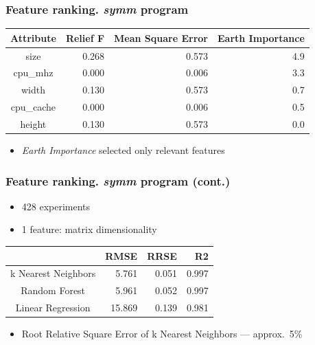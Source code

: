 \documentclass{beamer}
\begin{document}
\begin{frame}
\frametitle{Feature ranking. \textit{symm} program}

	\begin{center}
	\begin{tabular}{|c|r|r|r|}
	\hline
	Attribute & Relief F & Mean Square Error & Earth Importance \\
	\hline
	size & 0.268 & 0.573 & 4.9 \\
	cpu\_mhz & 0.000 & 0.006 & 3.3 \\
	width & 0.130 & 0.573 & 0.7 \\
	cpu\_cache & 0.000 & 0.006 & 0.5 \\
	height & 0.130 & 0.573 & 0.0 \\
	\hline
	\end{tabular}
	\end{center}

	\begin{itemize}
		\item \textit{Earth Importance} selected only relevant features
	\end{itemize}

\end{frame}

\begin{frame}
\frametitle{Feature ranking. \textit{symm} program (cont.)}

	\begin{itemize}
		\item 428 experiments
		\item 1 feature: matrix dimensionality
	\end{itemize}

	\begin{center}
	\begin{tabular}{|c|r|r|r|}
	\hline
	 & RMSE & RRSE & R2 \\
	\hline
	k Nearest Neighbors & 5.761 & 0.051 & 0.997 \\
	Random Forest & 5.961 & 0.052 & 0.997 \\
	Linear Regression & 15.869 & 0.139 & 0.981 \\
	\hline
	\end{tabular}
	\end{center}

	\begin{itemize}
		\item Root Relative Square Error of k Nearest Neighbors --- approx.~5\%
	\end{itemize}

\end{frame}
\end{document}
